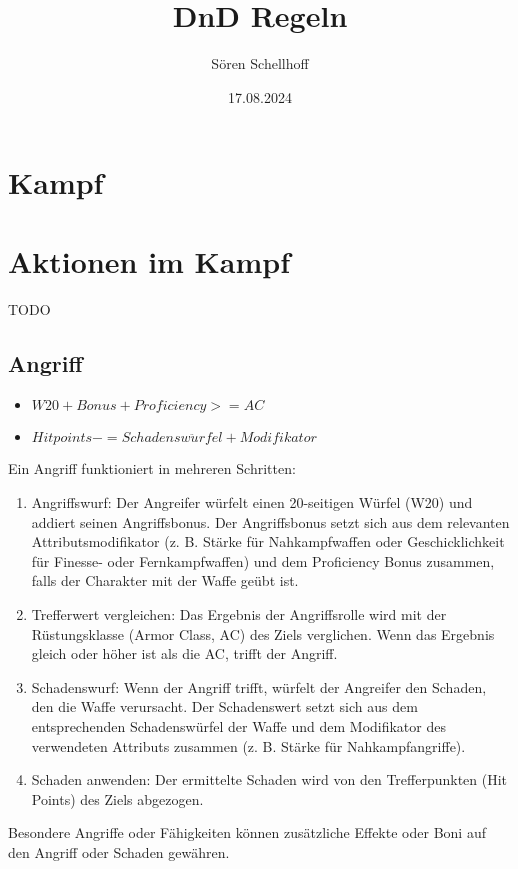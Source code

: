 \documentclass{book}
\title{DnD Regeln}
\author{Sören Schellhoff}
\date{17.08.2024}
\begin{document}
\maketitle

\chapter{Kampf}

\chapter{Aktionen im Kampf}
TODO

\section{Angriff}
\begin{itemize}
\item $W20 + Bonus + Proficiency >= AC$

\item $Hitpoints -= Schadensw\ddot{u}rfel + Modifikator$
\end{itemize}

Ein Angriff funktioniert in mehreren Schritten:

\begin{enumerate}

\item Angriffswurf: Der Angreifer würfelt einen 20-seitigen Würfel (W20) und addiert seinen Angriffsbonus. Der Angriffsbonus setzt sich aus dem relevanten Attributsmodifikator (z. B. Stärke für Nahkampfwaffen oder Geschicklichkeit für Finesse- oder Fernkampfwaffen) und dem Proficiency Bonus zusammen, falls der Charakter mit der Waffe geübt ist.
\item Trefferwert vergleichen: Das Ergebnis der Angriffsrolle wird mit der Rüstungsklasse (Armor Class, AC) des Ziels verglichen. Wenn das Ergebnis gleich oder höher ist als die AC, trifft der Angriff.
\item Schadenswurf: Wenn der Angriff trifft, würfelt der Angreifer den Schaden, den die Waffe verursacht. Der Schadenswert setzt sich aus dem entsprechenden Schadenswürfel der Waffe und dem Modifikator des verwendeten Attributs zusammen (z. B. Stärke für Nahkampfangriffe).
\item Schaden anwenden: Der ermittelte Schaden wird von den Trefferpunkten (Hit Points) des Ziels abgezogen.
\end{enumerate}
Besondere Angriffe oder Fähigkeiten können zusätzliche Effekte oder Boni auf den Angriff oder Schaden gewähren.
\end{document}
